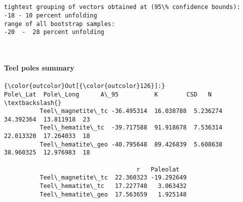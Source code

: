 \documentclass[11pt]{article}
\begin{document}
    \begin{center}
    \end{center}
    { \hspace*{\fill} \\}
    
    \begin{center}
    \end{center}
    { \hspace*{\fill} \\}
    
    \begin{Verbatim}[commandchars=\\\{\}]
tightest grouping of vectors obtained at (95\% confidence bounds):
-18 - 10 percent unfolding
range of all bootstrap samples: 
-20  -  28 percent unfolding
    \end{Verbatim}

    \begin{center}
    \end{center}
    { \hspace*{\fill} \\}
    
    \paragraph{Teel poles summary}\label{teel-poles-summary}


            \begin{Verbatim}[commandchars=\\\{\}]
{\color{outcolor}Out[{\color{outcolor}126}]:}                     Pole\_Lat  Pole\_Long      A\_95          K        CSD   N  \textbackslash{}
          Teel\_magnetite\_tc -36.495314  16.038788  5.236274  34.392364  13.811918  23   
          Teel\_hematite\_tc  -39.717588  91.918678  7.536314  22.013320  17.264033  18   
          Teel\_hematite\_geo -40.795648  89.426839  5.608638  38.960325  12.976983  18   
          
                                     r   Paleolat  
          Teel\_magnetite\_tc  22.360323 -19.292649  
          Teel\_hematite\_tc   17.227740   3.063432  
          Teel\_hematite\_geo  17.563659   1.925148  
\end{Verbatim}
        
\end{document}
